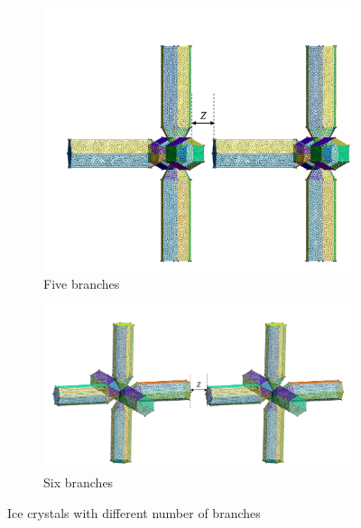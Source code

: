 \begin{figure}[H]
\begin{subfigure}{.5\linewidth}
    \hspace*{-1cm}\includegraphics[scale = 0.4]{figures/5branches}
    \caption{Five branches}
    \end{subfigure}%
    \begin{subfigure}{.5\linewidth}
    \centering
    \includegraphics[scale = 0.4]{figures/6branches}
    \caption{Six branches}
    \end{subfigure}
    \caption{Ice crystals with different number of branches}
    \label{Ice crystals with different number of branches}
    \end{figure}

